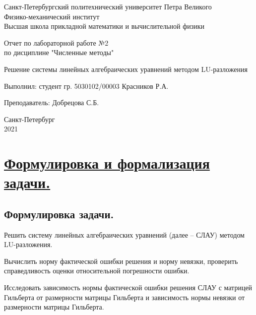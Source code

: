 \documentclass[a4paper, 12pt]{article}
\begin{document}
	\begin{titlepage}
		\begin{center}
			Санкт-Петербургский политехнический университет Петра Великого \\ Физико-механический институт \\ Высшая школа прикладной математики и вычислительной физики
		\end{center}
		\vspace{10em}
		\begin{center}
			\Large Отчет по лабораторной работе №2 \\ по дисциплине "Численные методы"
		\end{center}
		\vspace{1em}
		\begin{center}
			\Huge Решение системы линейных алгебраических уравнений методом LU-разложения
		\end{center}
		\vspace{15em}
		{\Large 
			
			Выполнил: студент гр. 5030102/00003 Красников Р.А.
			\vspace{1em}
			
			Преподаватель: Добрецова С.Б.}
		\vspace{\fill}
		\begin{center}
			Санкт-Петербург \\ 2021
		\end{center}
	\end{titlepage}
	\newpage
	
	\section{\underline{Формулировка и формализация задачи.}}
	
	\subsection{Формулировка задачи.}
	
	Решить систему линейных алгебраических уравнений (далее -- СЛАУ) методом LU-разложения.
	
	Вычислить норму фактической ошибки решения и норму невязки, проверить справедливость оценки относительной погрешности ошибки.
	
	Исследовать зависимость нормы фактической ошибки решения СЛАУ с матрицей Гильберта от размерности матрицы Гильберта и зависимость нормы невязки от размерности матрицы Гильберта.
	
\end{document}
